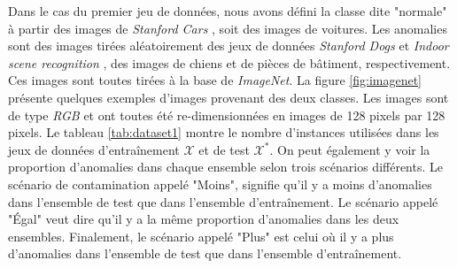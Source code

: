 Dans le cas du premier jeu de données, nous avons défini la classe dite "normale" à partir des images de \textit{Stanford Cars} \citep{KrauseStarkDengFei-Fei_3DRR2013}, soit des images de voitures. Les anomalies sont des images tirées aléatoirement des jeux de données \textit{Stanford Dogs} \citep{KhoslaYaoJayadevaprakashFeiFei_FGVC2011} et \textit{Indoor scene recognition} \citep{5206537}, des images de chiens et de pièces de bâtiment, respectivement. Ces images sont toutes tirées à la base de \textit{ImageNet}. La figure \ref{fig:imagenet} présente quelques exemples d'images provenant des deux classes. Les images sont de type \textit{RGB} et ont toutes été re-dimensionnées en images de 128 pixels par 128 pixels. Le tableau \ref{tab:dataset1} montre le nombre d'instances utilisées dans les jeux de données d'entraînement $\mathcal{X}$ et de test $\mathcal{X^*}$. On peut également y voir la proportion d'anomalies dans chaque ensemble selon trois scénarios différents. Le scénario de contamination appelé "Moins", signifie qu'il y a moins d'anomalies dans l'ensemble de test que dans l'ensemble d'entraînement. Le scénario appelé "Égal" veut dire qu'il y a la même proportion d'anomalies dans les deux ensembles. Finalement, le scénario appelé "Plus" est celui où il y a plus d'anomalies dans l'ensemble de test que dans l'ensemble d'entraînement.

